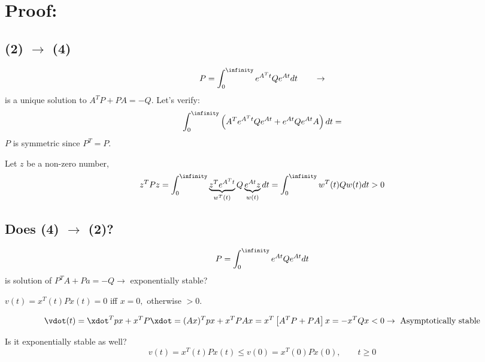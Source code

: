 \documentclass{article}
\begin{document}
\section{Proof:}

\subsection{(2) $\rightarrow$ (4)}
\begin{equation}
  P = \int_0^\infinity e^{A^Tt}Qe^{At} dt \qquad \rightarrow
\end{equation}
is a unique solution to $A^TP + PA = -Q$.
Let's verify:
\begin{equation}
  \int_0^\infinity \left(A^Te^{A^Tt}Qe^{At} + e^{At}Qe^{At}A\right) dt 
   = 
\end{equation}
$P$ is symmetric since $P^T = P$.

Let $z$ be a non-zero number, 
\begin{equation}
  z^TPz = \int_0^\infinity \underbrace{z^Te^{A^Tt}}_{w^T(t)}Q
  \underbrace{e^{At}z}_{w(t)} dt = \int_0^\infinity w^T(t)Qw(t)dt > 0
\end{equation}

\subsection{Does (4) $\rightarrow$ (2)?}
\begin{equation}
  P = \int_0^\infinity e^{At}Qe^{At}dt
\end{equation}
is solution of $P^TA+Pa = -Q \rightarrow$ exponentially stable?

$v(t) = x^T(t)Px(t) = 0$ iff $x = 0,$ otherwise $>0$.

\begin{equation}
  \vdot(t) = \xdot^Tpx + x^TP\xdot = (Ax)^Tpx + x^TPAx 
  = x^T\left[A^TP + PA\right]x = -x^TQx < 0\rightarrow \text{
    Asymptotically stable}
\end{equation}

Is it exponentially stable as well?
\begin{equation}
  v(t) = x^T(t) P x(t) \le v(0) = x^T(0)Px(0), \qquad t \ge 0
\end{equation}

\end{document}
